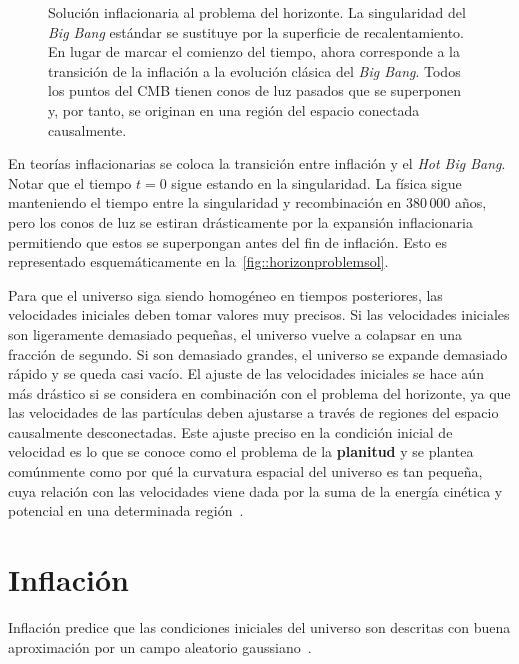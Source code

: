\begin{figure}
    \centering
    \def\svgwidth{0.75\textwidth}
    
    \caption[Solución inflacionaria al problema del horizonte]{Solución inflacionaria al problema del horizonte. La singularidad del \textit{Big Bang} estándar se sustituye por la superficie de recalentamiento. En lugar de marcar el comienzo del tiempo, ahora corresponde a la transición de la inflación a la evolución clásica del \textit{Big Bang}. Todos los puntos del CMB tienen conos de luz pasados que se superponen y, por tanto, se originan en una región del espacio conectada causalmente.}
    \label{fig::horizonproblemsol}
\end{figure}
En teorías inflacionarias se coloca la transición entre inflación y el \textit{Hot Big Bang}. Notar que el tiempo \(t=0\) sigue estando en la singularidad. La física sigue manteniendo el tiempo entre la singularidad y recombinación en \(380\,000\) años, pero los conos de luz se estiran drásticamente por la expansión inflacionaria permitiendo que estos se superpongan antes del fin de inflación. Esto es representado esquemáticamente en la~\autoref{fig::horizonproblemsol}.

Para que el universo siga siendo homogéneo en tiempos posteriores, las velocidades iniciales deben tomar valores muy precisos. Si las velocidades iniciales son ligeramente demasiado pequeñas, el universo vuelve a colapsar en una fracción de segundo. Si son demasiado grandes, el universo se expande demasiado rápido y se queda casi vacío. El ajuste de las velocidades iniciales se hace aún más drástico si se considera en combinación con el problema del horizonte, ya que las velocidades de las partículas deben ajustarse a través de regiones del espacio causalmente desconectadas. Este ajuste preciso en la condición inicial de velocidad es lo que se conoce como el problema de la \textbf{planitud} y se plantea comúnmente como por qué la curvatura espacial del universo es tan pequeña, cuya relación con las velocidades viene dada por la suma de la energía cinética y potencial en una determinada región~\cite{baumann2022cosmology}.
\section{Inflación}
Inflación predice que las condiciones iniciales del universo son descritas con buena aproximación por un campo aleatorio gaussiano~\cite{baumann2022cosmology,dodelson2020modern}.